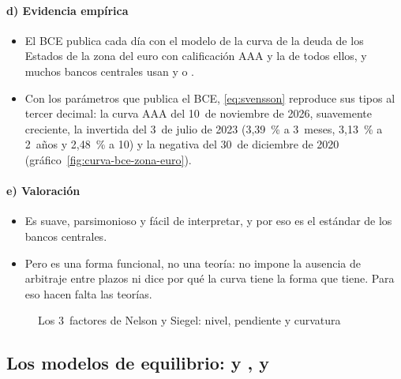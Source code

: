 \documentclass[11pt]{article}
\begin{document}
\paragraph{d) Evidencia empírica}
\begin{itemize}
\item El BCE publica cada día con el modelo de  la curva de la deuda de los Estados de la zona del euro con calificación AAA y la de todos ellos\nocite{BCE2026YC}, y muchos bancos centrales usan  y  o \nocite{BIS2005ZeroCoupon}.
\item Con los parámetros que publica el BCE, \eqref{eq:svensson} reproduce sus tipos al tercer decimal: la curva AAA del 10~de noviembre de 2026, suavemente creciente, la invertida del 3~de julio de 2023 (3,39~\% a 3~meses, 3,13~\% a 2~años y 2,48~\% a 10) y la negativa del 30~de diciembre de 2020 (gráfico~\ref{fig:curva-bce-zona-euro})\nocite{BCE2026YC}.
\end{itemize}

\paragraph{e) Valoración}
\begin{itemize}
\item Es suave, parsimonioso y fácil de interpretar, y por eso es el estándar de los bancos centrales.
\item Pero es una forma funcional, no una teoría: no impone la ausencia de arbitraje entre plazos ni dice por qué la curva tiene la forma que tiene. Para eso hacen falta las teorías.
\end{itemize}

\begin{figure}[H]
\centering
\caption{Los 3~factores de Nelson y Siegel: nivel, pendiente y curvatura}\label{fig:nss-factores}
\end{figure}

\subsection{Los modelos de equilibrio:\cortetitulo{}  y ,  y }\label{sec:vasicek}
\end{document}
